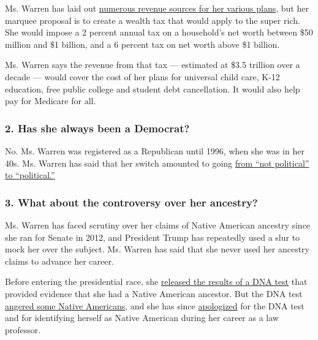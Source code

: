 Ms. Warren has laid out
\href{https://www.nytimes.com/interactive/2019/11/06/us/politics/elizabeth-warren-policies-taxes.html}{numerous
revenue sources for her various plans}, but her marquee proposal is to
create a wealth tax that would apply to the super rich. She would impose
a 2 percent annual tax on a household's net worth between \$50 million
and \$1 billion, and a 6 percent tax on net worth above \$1 billion.

Ms. Warren says the revenue from that tax --- estimated at \$3.5
trillion over a decade --- would cover the cost of her plans for
universal child care, K-12 education, free public college and student
debt cancellation. It would also help pay for Medicare for all.

\hypertarget{2-has-she-always-been-a-democrat}{%
\subsubsection{\texorpdfstring{\textbf{2. Has she always been a
Democrat?}}{2. Has she always been a Democrat?}}\label{2-has-she-always-been-a-democrat}}

No. Ms. Warren was registered as a Republican until 1996, when she was
in her 40s. Ms. Warren has said that her switch amounted to going
\href{https://www.nytimes.com/2019/08/25/us/politics/elizabeth-warren-republican-history.html}{from
``not political'' to ``political.''}

\hypertarget{3-what-about-the-controversy-over-her-ancestry}{%
\subsubsection{\texorpdfstring{\textbf{3. What about the controversy
over her
ancestry?}}{3. What about the controversy over her ancestry?}}\label{3-what-about-the-controversy-over-her-ancestry}}

Ms. Warren has faced scrutiny over her claims of Native American
ancestry since she ran for Senate in 2012, and President Trump has
repeatedly used a slur to mock her over the subject. Ms. Warren has said
that she never used her ancestry claims to advance her career.

Before entering the presidential race, she
\href{https://www.nytimes.com/2018/10/15/us/politics/elizabeth-warren-dna-ancestry.html}{released
the results of a DNA test} that provided evidence that she had a Native
American ancestor. But the DNA test
\href{https://www.nytimes.com/2018/10/17/us/politics/elizabeth-warren-dna-test.html}{angered
some Native Americans}, and she has since
\href{https://www.nytimes.com/2019/08/19/us/politics/elizabeth-warren-native-american.html}{apologized}
for the DNA test and for identifying herself as Native American during
her career as a law professor.

